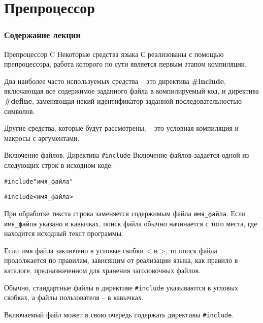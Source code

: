 \documentclass{beamer}
\begin{document}
\section{Препроцессор}

\begin{frame}
  \frametitle{Содержание лекции}
  \tableofcontents[current]
\end{frame}

\begin{frame}{Препроцессор C}
    Некоторые средства языка С реализованы с помощью препроцессора, работа которого по сути является первым этапом компиляции.
    
    \medskip
    Два наиболее часто используемых средства -- это директива \textbf{\#include}, включающая все содержимое заданного файла в компилируемый код, и директива \textbf{\#define}, заменяющая некий идентификатор заданной последовательностью символов. 

    \medskip
    Другие средства, которые будут рассмотрены, -- это условная компиляция и макросы с аргументами.
\end{frame}


\begin{frame}{Включение файлов. Директива \texttt{\#include}}
    Включение файлов задается одной из следующих строк в исходном коде:
    
    \begin{alltt}
    \#include "имя\_файла"
    
    \#include <имя\_файла>
    \end{alltt}
    
    При обработке текста строка заменяется содержимым файла \texttt{имя\_файла}. Если \texttt{имя\_файла} указано в кавычках, поиск файла обычно начинается с того места, где находится исходный текст программы.
    
    \medskip
    Если имя файла заключено в угловые скобки < и >, то поиск файла продолжается по правилам, зависящим от реализации языка, как правило в каталоге, предназначенном для хранения заголовочных файлов.
    
    \medskip
    Обычно, стандартные файлы в директиве \texttt{\#include} указываются в угловых скобках, а файлы пользователя – в кавычках.
    
    \medskip
    Включаемый файл может в свою очередь содержать директивы \texttt{\#include}.
\end{frame}
\end{document}
